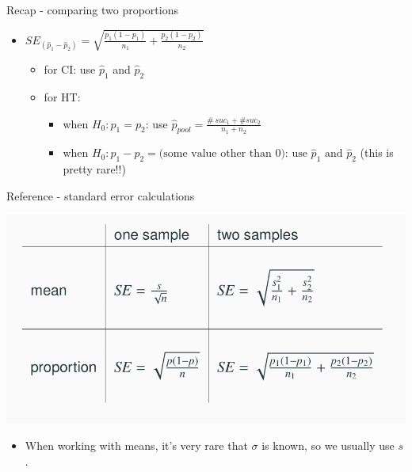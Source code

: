 \documentclass[
  ignorenonframetext,
]{beamer}
\providecommand{\tightlist}{%
  \setlength{\itemsep}{0pt}\setlength{\parskip}{0pt}}
\begin{document}
\begin{frame}{Recap - comparing two proportions}
\protect\hypertarget{recap---comparing-two-proportions-1}{}

\begin{itemize}
\tightlist
\item
  \(SE_{(\hat{p}_1 - \hat{p}_2)} = \sqrt{ \frac{p_1(1-p_1)}{n_1} + \frac{p_2(1-p_2)}{n_2} }\)

  \begin{itemize}
  \tightlist
  \item
    for CI: use \(\hat{p}_1\) and \(\hat{p}_2\)
  \item
    for HT:

    \begin{itemize}
    \tightlist
    \item
      when \(H_0: p_1 = p_2\): use
      \(\hat{p}_{pool} = \frac{\#~suc_1 + \#suc_2}{n_1 + n_2}\)
    \item
      when
      \(H_0: p_1 - p_2 = \text{(some value other than 0): use } \hat{p}_1 \text{ and } \hat{p}_2\)
      (this is pretty rare!!)
    \end{itemize}
  \end{itemize}
\end{itemize}

\end{frame}

\begin{frame}{Reference - standard error calculations}
\protect\hypertarget{reference---standard-error-calculations}{}

\includegraphics[width=650px]{ref_table}

\begin{itemize}
\tightlist
\item
  When working with means, it's very rare that \(\sigma\) is known, so
  we usually use \(s\).
\end{itemize}

\end{frame}
\end{document}

